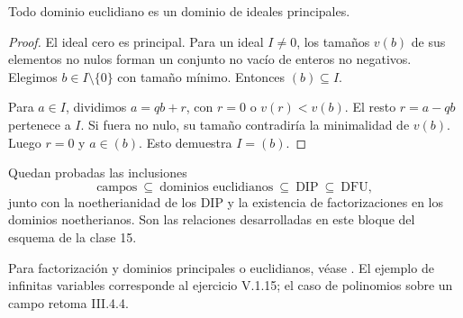 \begin{prop}\label{prop:C16-euclidiano}
Todo dominio euclidiano es un dominio de ideales principales.
\end{prop}
\begin{proof}
El ideal cero es principal. Para un ideal $I\ne0$, los tamaños $v(b)$ de sus elementos no nulos forman un conjunto no vacío de enteros no negativos. Elegimos $b\in I\setminus\{0\}$ con tamaño mínimo. Entonces $(b)\subseteq I$.

Para $a\in I$, dividimos $a=qb+r$, con $r=0$ o $v(r)<v(b)$. El resto $r=a-qb$ pertenece a $I$. Si fuera no nulo, su tamaño contradiría la minimalidad de $v(b)$. Luego $r=0$ y $a\in(b)$. Esto demuestra $I=(b)$.
\end{proof}
Quedan probadas las inclusiones
\[
\text{campos}\ \subseteq\ \text{dominios euclidianos}
\ \subseteq\ \text{DIP}\ \subseteq\ \text{DFU},
\]
junto con la noetherianidad de los DIP y la existencia de factorizaciones en los dominios noetherianos. Son las relaciones desarrolladas en este bloque del esquema de la clase 15.

\begin{obs}
Para factorización y dominios principales o euclidianos, véase \citet[cap.~V, 1.7--12 y 2.1--8]{aluffi2009}. El ejemplo de infinitas variables corresponde al ejercicio V.1.15; el caso de polinomios sobre un campo retoma III.4.4.
\end{obs}

